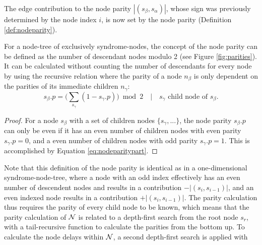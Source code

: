 The edge contribution to the node parity $|(s_\beta, s_\alpha)|$, whose sign was previously determined by the node index $i$, is now set by the node parity (Definition \ref{def:nodeparity}). 
\begin{lemma}\label{lem:nodeparitypart}
  For a node-tree of exclusively syndrome-nodes, the concept of the node parity can be defined as the number of descendant nodes modulo 2 (see Figure \ref{fig:parities}). It can be calculated without counting the number of descendants for every node by using the recursive relation where the parity of a node $n_\beta$ is only dependent on the parities of its immediate children $n_\gamma$:
  \begin{equation}\label{eq:nodeparitypart}
    s_\beta.p = \big( \sum_{s_\gamma} (1-s_\gamma.p) \big ) \bmod 2 \hspace{1em} | \hspace{1em} s_\gamma \text{ child node of } s_\beta.
  \end{equation}
\end{lemma}
\begin{proof}
  For a node $s_\beta$ with a set of children nodes $\{s_\gamma, ...\}$, the node parity $s_\beta.p$ can only be even if it has an even number of children nodes with even parity $s_\gamma.p = 0$, and a even number of children nodes with odd parity $s_\gamma.p=1$. This is accomplished by Equation \ref{eq:nodeparitypart}. 
\end{proof}
Note that this definition of the node parity is identical as in a one-dimensional syndrome-node-tree, where a node with an odd index effectively has an even number of descendent nodes and results in a contribution $-|(s_i, s_{i-1})|$, and an even indexed node results in a contribution $+|(s_i, s_{i-1})|$. The parity calculation thus requires the parity of every child node to be known, which means that the parity calculation of $\mathcal{N}$ is related to a depth-first search from the root node $s_r$, with a tail-recursive function to calculate the parities from the bottom up. To calculate the node delays within $\mathcal{N}$, a second depth-first search is applied with
